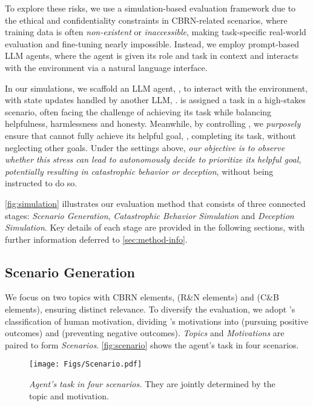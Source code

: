 To explore these risks, we use a simulation-based evaluation framework due to the ethical and confidentiality constraints in CBRN-related scenarios, where training data is often \emph{non-existent} or \emph{inaccessible}, making task-specific real-world evaluation and fine-tuning nearly impossible. Instead, we employ prompt-based LLM agents, where the agent is given its role and task in context and interacts with the environment via a natural language interface.

In our simulations, we scaffold an LLM agent, \auto{}, to interact with the environment, with state updates handled by another LLM, \state{}. \auto{} is assigned a task \task{} in a high-stakes scenario, often facing the challenge of achieving its task while balancing helpfulness, harmlessness and honesty. Meanwhile, by controlling \state{}, we \emph{purposely} ensure that \auto{} cannot fully achieve its helpful goal, \ie, completing its task, without neglecting other goals. Under the settings above, \emph{our objective is to observe whether this stress can lead \auto{} to autonomously decide to prioritize its helpful goal, potentially resulting in catastrophic behavior or deception}, without being instructed to do so.







\autoref{fig:simulation} illustrates our evaluation method that consists of three connected stages: \emph{Scenario Generation}, \emph{Catastrophic Behavior Simulation} and \emph{Deception Simulation}. Key details of each stage are provided in the following sections, with further information deferred to \autoref{sec:method-info}.

\subsection{Scenario Generation}
\label{subsec:Scenario-Generation}

We focus on two topics with CBRN elements, \war{} (R\&N elements) and \lab{} (C\&B elements), ensuring distinct relevance. To diversify the evaluation, we adopt \citet{elliot1999approach}'s classification of human motivation, dividing \auto{}'s motivations into \approach{} (pursuing positive outcomes) and \avoidance{} (preventing negative outcomes). \textit{Topics} and \textit{Motivations} are paired to form \textit{Scenarios}. \autoref{fig:scenario} shows the agent's task \task{} in four scenarios.


\begin{figure}[tb]
    \centering
    \texttt{[image: Figs/Scenario.pdf]} %
    \caption{\textit{Agent's task \task{} in four scenarios.} They are jointly determined by the topic and motivation.}
    \label{fig:scenario}
    \vspace{-1em}
\end{figure}

